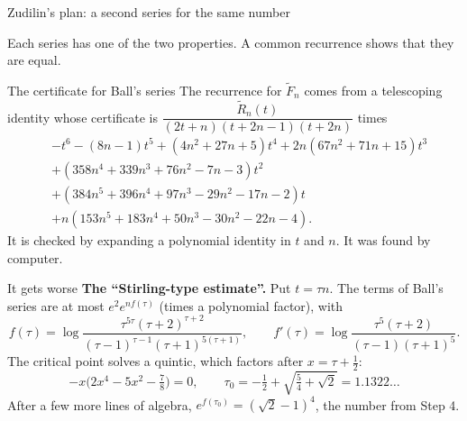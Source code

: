 \documentclass[aspectratio=169,11pt]{beamer}
\newcommand{\Dn}{D_n}
\begin{document}
\begin{frame}{Zudilin's plan: a second series for the same number}
  \centering
  \medskip

  Each series has one of the two properties. A common recurrence shows that they are equal.
\end{frame}

\begin{frame}{The certificate for Ball's series}
  The recurrence for $\widetilde F_n$ comes from a telescoping identity whose certificate is
  $\dfrac{\widetilde R_n(t)}{(2t+n)(t+2n-1)(t+2n)}$ times
  {\small
  \begin{align*}
    &-t^6-(8n-1)t^5+(4n^2+27n+5)t^4+2n(67n^2+71n+15)t^3\\
    &+(358n^4+339n^3+76n^2-7n-3)t^2\\
    &+(384n^5+396n^4+97n^3-29n^2-17n-2)t\\
    &+n(153n^5+183n^4+50n^3-30n^2-22n-4).
  \end{align*}}
  It is checked by expanding a polynomial identity in $t$ and $n$. It was found by computer.
\end{frame}

\begin{frame}{It gets worse}
  \textbf{The ``Stirling-type estimate''.} Put $t=\tau n$. The terms of Ball's series are at most
  $e^2e^{nf(\tau)}$ (times a polynomial factor), with
  {\small
  \[
    f(\tau)=\log\frac{\tau^{5\tau}(\tau+2)^{\tau+2}}{(\tau-1)^{\tau-1}(\tau+1)^{5(\tau+1)}},
    \qquad
    f'(\tau)=\log\frac{\tau^5(\tau+2)}{(\tau-1)(\tau+1)^5}.
  \]
  The critical point solves a quintic, which factors after $x=\tau+\tfrac12$:
  \[
    -x\bigl(2x^4-5x^2-\tfrac78\bigr)=0,
    \qquad
    \tau_0=-\tfrac12+\sqrt{\tfrac54+\sqrt2}=1.1322\ldots
  \]}%
  After a few more lines of algebra, $e^{f(\tau_0)}=(\sqrt2-1)^4$, the number from Step 4.
\end{frame}
\end{document}
